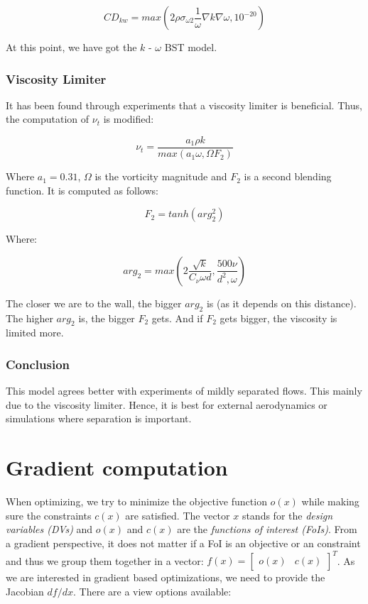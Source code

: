 \begin{equation}
    CD_{kw} = max \left( 
    2 \rho \sigma_{\omega 2} \frac{1}{\omega} \nabla k \nabla \omega, 10^{-20} 
    \right)
\end{equation}

At this point, we have got the $k$ - $\omega$ BST model.


\subsubsection{Viscosity Limiter}
 It has been found through experiments that a viscosity limiter is beneficial.
 Thus, the computation of $\nu_t$ is modified:

\begin{equation}
    \nu_t = \frac{a_1 \rho k}{max(a_1 \omega, \Omega F_2)}
\end{equation}

\noindent Where $a_1 = 0.31$, $\Omega$ is the vorticity magnitude  and $F_2$ is
a second blending function. It is computed as follows:

\begin{equation}
    F_2 = tanh(arg_2^2)
\end{equation}

\noindent Where:

\begin{equation}
    arg_2 = max \left( 2\frac{\sqrt{k}}{C_{\nu} \omega d},
    \frac{500 \nu}{d^2, \omega}\right)
\end{equation}

\noindent The closer we are to the wall, the bigger $arg_2$ is (as it depends on
this distance). The higher $arg_2$ is, the bigger $F_2$ gets. And if $F_2$ gets
bigger, the viscosity is limited more.


\subsubsection{Conclusion}
This model agrees better with experiments of mildly separated flows. This
mainly due to the viscosity limiter. Hence, it is best for external
aerodynamics or simulations where separation is important. \cite{cfd101_sst}



\section{Gradient computation}
When optimizing, we try to minimize the objective function $o(x)$ while making
sure the constraints $c(x)$ are satisfied. The vector $x$ stands for the
\textit{design variables (DVs)} and $o(x)$ and $c(x)$ are the \textit{functions
of interest (FoIs)}. From a gradient perspective, it does not matter if a FoI is
an objective or an constraint and thus we group them together in a vector:
$f(x) = \begin{bmatrix} o(x) & c(x)\end{bmatrix}^T$. As we are interested in
gradient based optimizations, we need to provide the Jacobian $df / dx$. There
are a view options available: \cite{mdobook} \cite{cm1}

